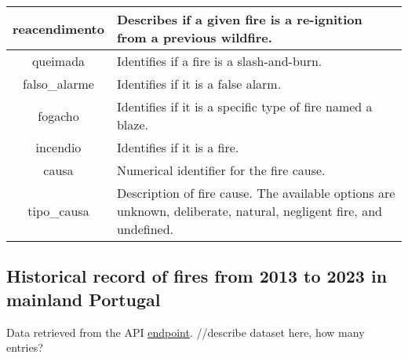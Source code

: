 \begin{table}[h!]
\begin{tabular}{|c|p{7.5cm}|}
\hline
reacendimento & Describes if a given fire is a re-ignition from a previous wildfire. \\
\hline
queimada & Identifies if a fire is a slash-and-burn. \\
\hline
falso\_alarme & Identifies if it is a false alarm. \\
\hline
fogacho & Identifies if it is a specific type of fire named a blaze. \\
\hline
incendio & Identifies if it is a fire. \\
\hline
causa & Numerical identifier for the fire cause. \\
\hline
tipo\_causa & Description of fire cause. The available options are unknown, deliberate, natural, negligent fire, and undefined. \\
\hline
\end{tabular}
\end{table}


\subsection{Historical record of fires from 2013 to 2023 in mainland Portugal \cite{icnf2024}}
\label{dataset_icnf2013_2023}

Data retrieved from the API \href{https://fogos.icnf.pt/localizador/webserviceocorrencias.asp?ano=YEAR}{endpoint}.
//describe dataset here, how many entries?


